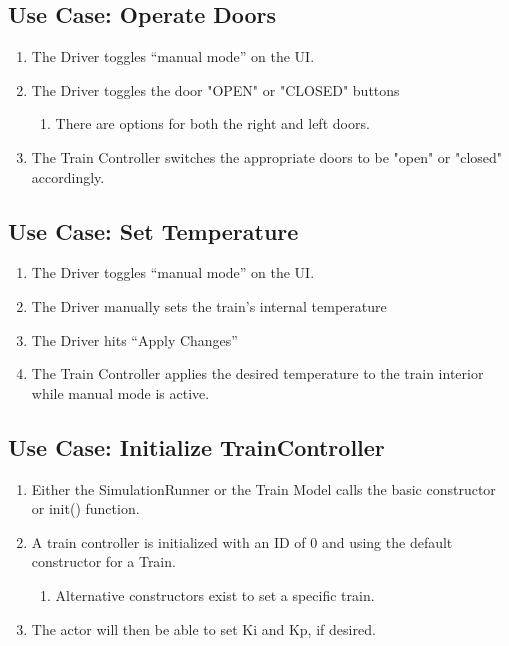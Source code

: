\documentclass{scrreprt}
\begin{document}
\subsection{Use Case: Operate Doors}
\begin{enumerate}
	\item The Driver toggles “manual mode” on the UI.
	\item The Driver toggles the door "OPEN" or "CLOSED" buttons
	\begin{enumerate}
		\item There are options for both the right and left doors.
	\end{enumerate}
	\item The Train Controller switches the appropriate doors to be "open" or "closed" accordingly.
\end{enumerate}

\subsection{Use Case: Set Temperature}
\begin{enumerate}
	\item The Driver toggles “manual mode” on the UI.
	\item The Driver manually sets the train's internal temperature
	\item The Driver hits “Apply Changes”
	\item The Train Controller applies the desired temperature to the train interior while manual mode is active.
\end{enumerate}

\subsection{Use Case: Initialize TrainController}
\begin{enumerate}
	\item Either the SimulationRunner or the Train Model calls the basic constructor or init() function.
	\item A train controller is initialized with an ID of 0 and using the default constructor for a Train.
	\begin{enumerate}
		\item Alternative constructors exist to set a specific train.
	\end{enumerate}
	\item The actor will then be able to set Ki and Kp, if desired.
\end{enumerate}
\end{document}
